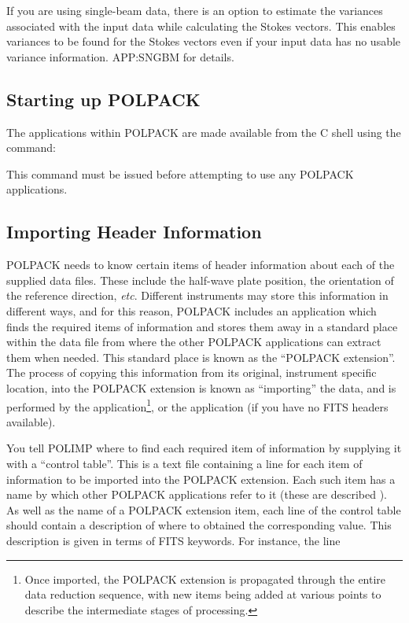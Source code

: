\documentclass[twoside,11pt]{starlink}
\begin{document}
If you are using single-beam data, there is an option to estimate the
variances associated with the input data while calculating the Stokes
vectors.
This enables variances to be found for the Stokes vectors even if your
input data has no usable variance information. 
{}{APP:SNGBM} for details.

\subsection{\label{SEC:START}Starting up POLPACK}

The applications within POLPACK are made available from the C shell using the
command:
\begin{terminalv}
\end{terminalv}

This command must be issued before attempting to use any POLPACK
applications.

\subsection{\label{SEC:IMPORT}Importing Header Information}
POLPACK needs to know certain items of header information about each of
the supplied data files. These include the half-wave plate position, the
orientation of the reference direction, \emph{etc}. Different instruments may
store this information in different ways, and for this reason, POLPACK
includes an application which finds the required items of information and
stores them away in a standard place within the data file from where the
other POLPACK applications can extract them when needed. This standard
place is known as the ``POLPACK extension''. The process of copying this
information from its original, instrument specific location, into the
POLPACK extension is known as ``importing'' the data, and is performed by
the  application\footnote{Once imported, the POLPACK
extension is propagated through the entire data reduction sequence, with
new items being added at various points to describe the intermediate
stages of processing.}, or the  application (if
you have no FITS headers available).

You tell POLIMP where to find each required item of information by
supplying it with a ``control table''. This is a text file containing a
line for each item of information to be imported into the POLPACK
extension. Each such item has a name by which other POLPACK applications
refer to it (these are described ). As well as the name of a POLPACK extension
item, each line of the control table should contain a description of where to
obtained the corresponding value. This description is given in terms of
FITS keywords. For instance, the line
\end{document}
